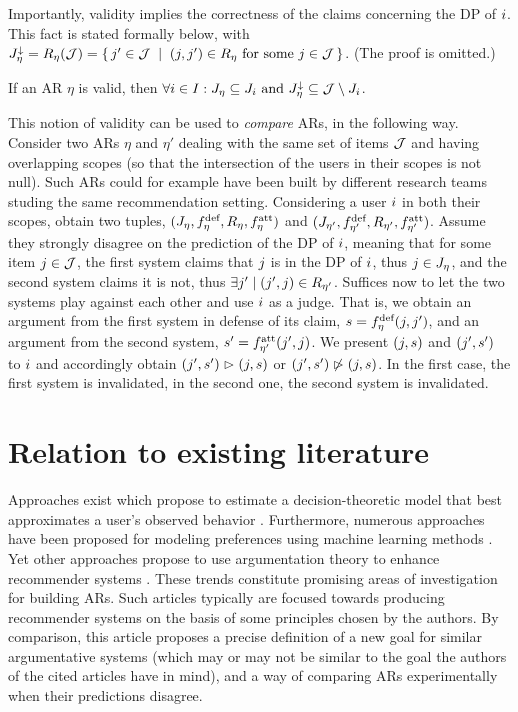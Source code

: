 \documentclass[french, english]{da2pl2018}
\begin{document}
Importantly, validity implies the correctness of the claims concerning the \ac{DP} of $\usr$. This fact is stated formally below, with $\mnitems = R_\eta(\allitems) = \set{\itm' \in \allitems \suchthat (\itm, \itm') \in R_\eta \text{ for some } \itm \in \allitems}$. (The proof is omitted.)
\begin{fact}
	If an \ac{AR} $\eta$ is valid, then $\forall \usr \in \allusers: \mitems \subseteq \uitems \text{ and } \mnitems \subseteq \allitems \setminus \uitems$.
\end{fact}

This notion of validity can be used to \emph{compare} \acp{AR}, in the following way. Consider two \acp{AR} $\eta$ and $\eta'$ dealing with the same set of items $\allitems$ and having overlapping scopes (so that the intersection of the users in their scopes is not null). Such \acp{AR} could for example have been built by different research teams studing the same recommendation setting. Considering a user $\usr$ in both their scopes, obtain two tuples, $(\mitems, \mdef, R_\eta, \matt)$ and $(\mitems[\eta'], \mdef[\eta'], R_{\eta'}, \matt[\eta'])$. Assume they strongly disagree on the prediction of the \ac{DP} of $\usr$, meaning that for some item $\itm \in \allitems$, the first system claims that $\itm$ is in the \ac{DP} of $\usr$, thus $\itm \in \mitems$, and the second system claims it is not, thus $\exists \itm' \suchthat (\itm', \itm) \in R_{\eta'}$. Suffices now to let the two systems play against each other and use $\usr$ as a judge. That is, we obtain an argument from the first system in defense of its claim, $\ar = \mdef(\itm, \itm')$, and an argument from the second system, $\ar' = \matt[\eta'](\itm', \itm)$. We present $(\itm, \ar)$ and $(\itm', \ar')$ to $\usr$ and accordingly obtain $(\itm', \ar') \ibeats (\itm, \ar)$ or $(\itm', \ar') \nibeats (\itm, \ar)$. In the first case, the first system is invalidated, in the second one, the second system is invalidated.

\section{Relation to existing literature}
\label{sec:litt}
Approaches exist which propose to estimate a decision-theoretic model that best approximates a user’s observed behavior \citep{greco_trends_2010, sobrie_learning_2018}. 
Furthermore, numerous approaches have been proposed for modeling preferences using machine learning methods \citep{furnkranz_preference_2010}. Yet other approaches propose to use argumentation theory to enhance recommender systems \citep{chesnevar_empowering_2009, rago_argumentation-based_2018}. These trends constitute promising areas of investigation for building \acp{AR}. Such articles typically are focused towards producing recommender systems on the basis of some principles chosen by the authors. By comparison, this article proposes a precise definition of a new goal for similar argumentative systems (which may or may not be similar to the goal the authors of the cited articles have in mind), and a way of comparing \acp{AR} experimentally when their predictions disagree.
\end{document}
